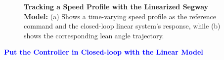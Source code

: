 \begin{figure}[htb]%
\centering
{}%
\hfill%
%
\hfill%
    \caption[]{\textbf{Tracking a Speed Profile with the Linearized Segway Model:} (a) Shows a time-varying speed profile as the reference command and the closed-loop linear system's response, while (b) shows the corresponding lean angle trajectory.}
    \label{fig:SegwaySpeedProfileLeanAngleLinearModel}
\end{figure}

\bigskip
\textcolor{blue}{\bf \large Put the Controller in Closed-loop with the Linear Model}
\bigskip

